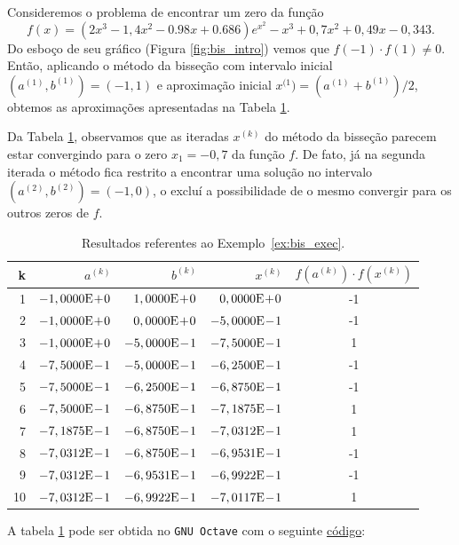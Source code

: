 \begin{ex}\label{ex:bis_exec}
  Consideremos o problema de encontrar um zero da função
  \begin{equation}
    f(x) = (2x^3-1,4x^2-0.98x+0.686)e^{x^2} - x^3 + 0,7x^2 + 0,49x - 0,343.
  \end{equation}
Do esboço de seu gráfico (Figura \ref{fig:bis_intro}) vemos que $f(-1)\cdot f(1) \neq 0$. Então, aplicando o método da bisseção com intervalo inicial $(a^{(1)}, b^{(1)}) = (-1, 1)$ e aproximação inicial $x^{(1}) = (a^{(1)}+b^{(1)})/2$, obtemos as aproximações apresentadas na Tabela \ref{tab:bis_exec}.

Da Tabela \ref{tab:bis_exec}, observamos que as iteradas $x^{(k)}$ do método da bisseção parecem estar convergindo para o zero $x_1 = -0,7$ da função $f$. De fato, já na segunda iterada o método fica restrito a encontrar uma solução no intervalo $(a^{(2)}, b^{(2)}) = (-1, 0)$, o excluí a possibilidade de o mesmo convergir para os outros zeros de $f$.

\begin{table}[h!]
  \centering
  \caption{Resultados referentes ao Exemplo~\ref{ex:bis_exec}.}
  \begin{tabular}{r|rr|r|c}
    k & $a^{(k)}$ & $b^{(k)}$ & $x^{(k)}$ & $f(a^{(k)})\cdot f(x^{(k)})$\\\hline
    1 & $-1,0000\mathrm{E}\!+\!0$ & $1,0000\mathrm{E}\!+\!0$ & $0,0000\mathrm{E}\!+\!0$ & -1 \\
    2 & $-1,0000\mathrm{E}\!+\!0$ & $0,0000\mathrm{E}\!+\!0$ & $-5,0000\mathrm{E}\!-\!1$ & -1 \\
    3 & $-1,0000\mathrm{E}\!+\!0$ & $-5,0000\mathrm{E}\!-\!1$ & $-7,5000\mathrm{E}\!-\!1$ & 1 \\
    4 & $-7,5000\mathrm{E}\!-\!1$ & $-5,0000\mathrm{E}\!-\!1$ & $-6,2500\mathrm{E}\!-\!1$ &  -1 \\
    5 & $-7,5000\mathrm{E}\!-\!1$ & $-6,2500\mathrm{E}\!-\!1$ & $-6,8750\mathrm{E}\!-\!1$ &  -1 \\
    6 & $-7,5000\mathrm{E}\!-\!1$ & $-6,8750\mathrm{E}\!-\!1$ & $-7,1875\mathrm{E}\!-\!1$ &  1 \\
    7 & $-7,1875\mathrm{E}\!-\!1$ & $-6,8750\mathrm{E}\!-\!1$ & $-7,0312\mathrm{E}\!-\!1$ & 1 \\
    8 & $-7,0312\mathrm{E}\!-\!1$ & $-6,8750\mathrm{E}\!-\!1$ & $-6,9531\mathrm{E}\!-\!1$ & -1 \\
    9 & $-7,0312\mathrm{E}\!-\!1$ & $-6,9531\mathrm{E}\!-\!1$ & $-6,9922\mathrm{E}\!-\!1$ & -1 \\
    10 & $-7,0312\mathrm{E}\!-\!1$ & $-6,9922\mathrm{E}\!-\!1$ & $-7,0117\mathrm{E}\!-\!1$ & 1 \\\hline
  \end{tabular}
  \label{tab:bis_exec}
\end{table}

\ifisoctave
A tabela \ref{tab:bis_exec} pode ser obtida no \verb+GNU Octave+ com o seguinte \href{https://github.com/phkonzen/notas/blob/master/src/MatematicaNumerica/cap_eq1d/dados/ex_bis_exec/ex_bis_exec.m}{código}:

\fi
\end{ex}

